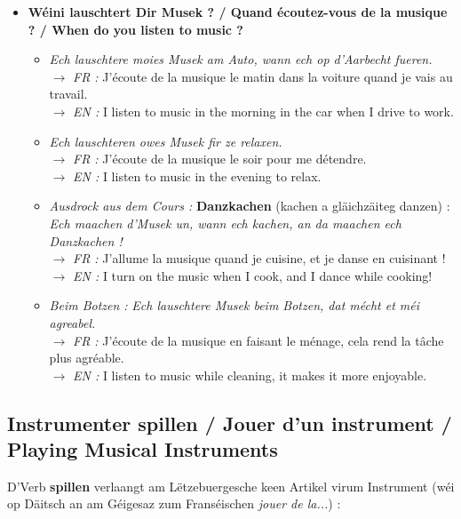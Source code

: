 \begin{itemize}
    \item \textbf{Wéini lauschtert Dir Musek ? / Quand écoutez-vous de la musique ? / When do you listen to music ?}
    \begin{itemize}
        \item \textit{Ech lauschtere moies Musek am Auto, wann ech op d'Aarbecht fueren.} \\
        $\rightarrow$ \textit{FR :} J'écoute de la musique le matin dans la voiture quand je vais au travail. \\
        $\rightarrow$ \textit{EN :} I listen to music in the morning in the car when I drive to work.
        \item \textit{Ech lauschteren owes Musek fir ze relaxen.} \\
        $\rightarrow$ \textit{FR :} J'écoute de la musique le soir pour me détendre. \\
        $\rightarrow$ \textit{EN :} I listen to music in the evening to relax.
        \item \textit{Ausdrock aus dem Cours :} \textbf{Danzkachen} (kachen a gläichzäiteg danzen) : \\
        \textit{Ech maachen d'Musek un, wann ech kachen, an da maachen ech Danzkachen !} \\
        $\rightarrow$ \textit{FR :} J'allume la musique quand je cuisine, et je danse en cuisinant ! \\
        $\rightarrow$ \textit{EN :} I turn on the music when I cook, and I dance while cooking!
        \item \textit{Beim Botzen :} \textit{Ech lauschtere Musek beim Botzen, dat mécht et méi agreabel.} \\
        $\rightarrow$ \textit{FR :} J'écoute de la musique en faisant le ménage, cela rend la tâche plus agréable. \\
        $\rightarrow$ \textit{EN :} I listen to music while cleaning, it makes it more enjoyable.
    \end{itemize}
\end{itemize}

\subsection{Instrumenter spillen / Jouer d'un instrument / Playing Musical Instruments}

D'Verb \textbf{spillen} verlaangt am Lëtzebuergesche keen Artikel virum Instrument (wéi op Däitsch an am Géigesaz zum Franséischen \textit{\flqq jouer de la...\frqq}) :

